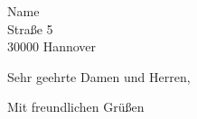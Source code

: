 \documentclass[a4paper,12pt]{scrlttr2}
\begin{document}

\begin{letter}{Name\\Straße 5\\30000 Hannover}
\opening{Sehr geehrte Damen und Herren,}
\closing{Mit freundlichen Grüßen}


\end{letter}
\end{document}
